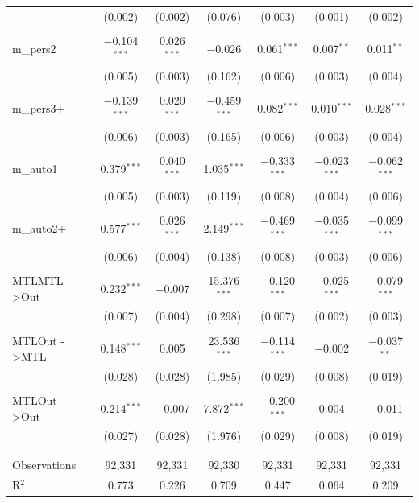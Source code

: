 \begin{table}[!htbp]
\begin{tabular}{@{\extracolsep{5pt}}lcccccc}
  & (0.002) & (0.002) & (0.076) & (0.003) & (0.001) & (0.002) \\ 
  & & & & & & \\ 
 m\_pers2 & $-$0.104$^{***}$ & 0.026$^{***}$ & $-$0.026 & 0.061$^{***}$ & 0.007$^{**}$ & 0.011$^{**}$ \\ 
  & (0.005) & (0.003) & (0.162) & (0.006) & (0.003) & (0.004) \\ 
  & & & & & & \\ 
 m\_pers3+ & $-$0.139$^{***}$ & 0.020$^{***}$ & $-$0.459$^{***}$ & 0.082$^{***}$ & 0.010$^{***}$ & 0.028$^{***}$ \\ 
  & (0.006) & (0.003) & (0.165) & (0.006) & (0.003) & (0.004) \\ 
  & & & & & & \\ 
 m\_auto1 & 0.379$^{***}$ & 0.040$^{***}$ & 1.035$^{***}$ & $-$0.333$^{***}$ & $-$0.023$^{***}$ & $-$0.062$^{***}$ \\ 
  & (0.005) & (0.003) & (0.119) & (0.008) & (0.004) & (0.006) \\ 
  & & & & & & \\ 
 m\_auto2+ & 0.577$^{***}$ & 0.026$^{***}$ & 2.149$^{***}$ & $-$0.469$^{***}$ & $-$0.035$^{***}$ & $-$0.099$^{***}$ \\ 
  & (0.006) & (0.004) & (0.138) & (0.008) & (0.003) & (0.006) \\ 
  & & & & & & \\ 
 MTLMTL -\textgreater  Out & 0.232$^{***}$ & $-$0.007 & 15.376$^{***}$ & $-$0.120$^{***}$ & $-$0.025$^{***}$ & $-$0.079$^{***}$ \\ 
  & (0.007) & (0.004) & (0.298) & (0.007) & (0.002) & (0.003) \\ 
  & & & & & & \\ 
 MTLOut -\textgreater  MTL & 0.148$^{***}$ & 0.005 & 23.536$^{***}$ & $-$0.114$^{***}$ & $-$0.002 & $-$0.037$^{**}$ \\ 
  & (0.028) & (0.028) & (1.985) & (0.029) & (0.008) & (0.019) \\ 
  & & & & & & \\ 
 MTLOut -\textgreater  Out & 0.214$^{***}$ & $-$0.007 & 7.872$^{***}$ & $-$0.200$^{***}$ & 0.004 & $-$0.011 \\ 
  & (0.027) & (0.028) & (1.976) & (0.029) & (0.008) & (0.019) \\ 
  & & & & & & \\ 
\hline \\[-1.8ex] 
Observations & 92,331 & 92,331 & 92,330 & 92,331 & 92,331 & 92,331 \\ 
R$^{2}$ & 0.773 & 0.226 & 0.709 & 0.447 & 0.064 & 0.209 \\ 

\end{tabular}
\end{table}
